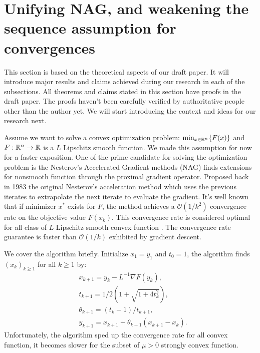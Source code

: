 \documentclass[12pt]{article}
\begin{document}
\section{Unifying NAG, and weakening the sequence assumption for convergences}\label{sec:unify-nes-acceleration}
    This section is based on the theoretical aspects of our draft paper. 
    It will introduce major results and claims achieved during our research in each of the subsections. 
    All theorems and claims stated in this section have proofs in the draft paper. 
    The proofs haven't been carefully verified by authoritative people other than the author yet. 
    We will start introducing the context and ideas for our research next. 
    \par
    Assume we want to solve a convex optimization problem: $\min_{x \in \mathbb R^n} \{F(x)\}$ and $F: \mathbb R^n \rightarrow \mathbb R$ is a $L$ Lipschitz smooth function. 
    We made this assumption for now for a faster exposition. 
    One of the prime candidate for solving the optimization problem is the Nesterov's Accelerated Gradient methods (NAG) finds extensions for nonsmooth function through the proximal gradient operator.
    Proposed back in 1983 the original Nesterov's acceleration method \cite{nesterov_method_1983}
    which uses the previous iterates to extrapolate the next iterate to evaluate the gradient. 
    It's well known that if minimizer $x^*$ exists for $F$, the method achieves a $\mathcal O(1/k^2)$ convergence rate on the objective value $F(x_k)$.     
    This convergence rate is considered optimal for all class of $L$ Lipschitz smooth convex function \cite{nesterov_lectures_2018}. 
    The convergence rate guarantee is faster than $\mathcal O(1/k)$ exhibited by gradient descent. 
    \par
    We cover the algorithm briefly. 
    Initialize $x_1 = y_1$ and $t_0 = 1$, the algorithm finds $(x_k)_{k \ge 1}$ for all $k \ge 1$ by: 
    \begin{align}\label{eqn:nag_example}
        & x_{k + 1} = y_k - L^{-1}\nabla F(y_k), 
        \\
        & t_{k + 1} = 1/2\left(1 + \sqrt{1 + 4t_{k}^2}\right), 
        \\
        & \theta_{k + 1} = (t_{k} - 1)/t_{k + 1}, 
        \\
        & y_{k + 1} = x_{k + 1} + \theta_{k + 1}(x_{k + 1} - x_k). 
    \end{align}
    Unfortunately, the algorithm sped up the convergence rate for all convex function, it becomes slower for the subset of $\mu > 0$ strongly convex function. 
\end{document}
